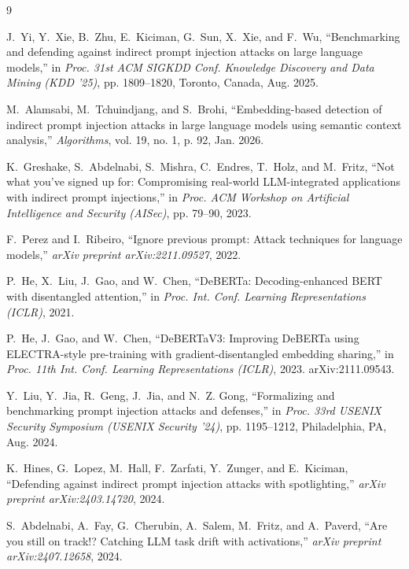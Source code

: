 \documentclass[10pt,conference]{IEEEtran}
\begin{document}

\begin{thebibliography}{9}

J.~Yi, Y.~Xie, B.~Zhu, E.~Kiciman, G.~Sun, X.~Xie, and F.~Wu,
``Benchmarking and defending against indirect prompt injection attacks on large language models,''
in \textit{Proc. 31st ACM SIGKDD Conf. Knowledge Discovery and Data Mining (KDD '25)},
pp. 1809--1820, Toronto, Canada, Aug. 2025.

M.~Alamsabi, M.~Tchuindjang, and S.~Brohi,
``Embedding-based detection of indirect prompt injection attacks in large language models using semantic context analysis,''
\textit{Algorithms}, vol. 19, no. 1, p. 92, Jan. 2026.

K.~Greshake, S.~Abdelnabi, S.~Mishra, C.~Endres, T.~Holz, and M.~Fritz,
``Not what you've signed up for: Compromising real-world LLM-integrated applications with indirect prompt injections,''
in \textit{Proc. ACM Workshop on Artificial Intelligence and Security (AISec)}, pp. 79--90, 2023.

F.~Perez and I.~Ribeiro,
``Ignore previous prompt: Attack techniques for language models,''
\textit{arXiv preprint arXiv:2211.09527}, 2022.

P.~He, X.~Liu, J.~Gao, and W.~Chen,
``DeBERTa: Decoding-enhanced BERT with disentangled attention,''
in \textit{Proc. Int. Conf. Learning Representations (ICLR)}, 2021.

P.~He, J.~Gao, and W.~Chen,
``DeBERTaV3: Improving DeBERTa using ELECTRA-style pre-training with gradient-disentangled embedding sharing,''
in \textit{Proc. 11th Int. Conf. Learning Representations (ICLR)}, 2023. arXiv:2111.09543.

Y.~Liu, Y.~Jia, R.~Geng, J.~Jia, and N.~Z. Gong,
``Formalizing and benchmarking prompt injection attacks and defenses,''
in \textit{Proc. 33rd USENIX Security Symposium (USENIX Security '24)},
pp. 1195--1212, Philadelphia, PA, Aug. 2024.

K.~Hines, G.~Lopez, M.~Hall, F.~Zarfati, Y.~Zunger, and E.~Kiciman,
``Defending against indirect prompt injection attacks with spotlighting,''
\textit{arXiv preprint arXiv:2403.14720}, 2024.

S.~Abdelnabi, A.~Fay, G.~Cherubin, A.~Salem, M.~Fritz, and A.~Paverd,
``Are you still on track!? Catching LLM task drift with activations,''
\textit{arXiv preprint arXiv:2407.12658}, 2024.

\end{thebibliography}
\end{document}
